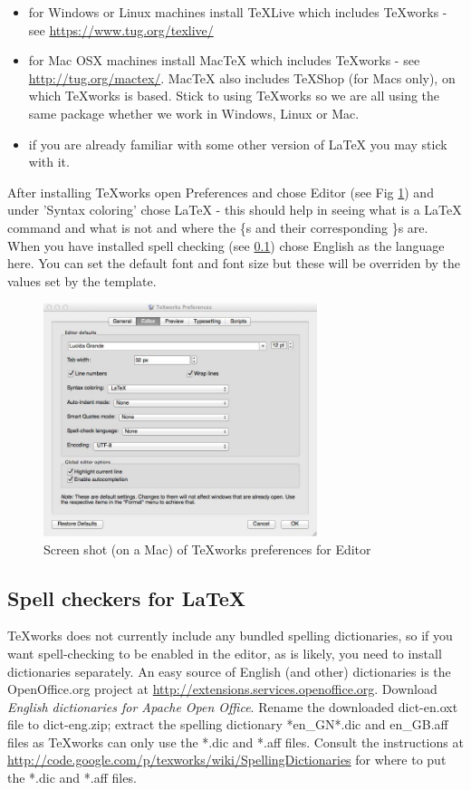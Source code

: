 \documentclass[twoside,fontsize=12pt,
     bibliography=totoc, %
     listof=totoc, %
     index=totoc, %
     onehalfspacing %
]{_MScDiss2017_cls}
\begin{document}
\begin{itemize}
\item for Windows or Linux machines install TeXLive which includes TeXworks - see \url{https://www.tug.org/texlive/} 
\item for Mac OSX machines install MacTeX which includes TeXworks - see \url{http://tug.org/mactex/}. MacTeX also includes TeXShop (for Macs only), on which TeXworks is based. Stick to using TeXworks so we are all using the same package whether we work in Windows, Linux or Mac.
\item if you are already familiar with some other version of LaTeX you may stick with it.
\end{itemize}

After installing TeXworks open Preferences and chose Editor (see Fig \ref{fig:texworks-prefs}) and under 'Syntax coloring' chose LaTeX - this should help in seeing what is a LaTeX command and what is not and where the \{s and their corresponding \}s are. When you have installed spell checking (see \ref{sec:spell}) chose English as the language here.
You can set the default font and font size but these will be overriden by the values set by the template.

\begin{figure}[hbtp]
  \begin{center}
  \includegraphics[width=80mm]{fig-texworks-preferences-editor.jpg}  %
  \caption{Screen shot (on a Mac) of TeXworks preferences for Editor} 
  \label{fig:texworks-prefs}
  \end{center}
\end{figure}

\subsection{Spell checkers for LaTeX}
\label{sec:spell}
TeXworks does not currently include any bundled spelling dictionaries, so if you want spell-checking to be enabled in the editor, as is likely, you need to install dictionaries separately. An easy source of English (and other) dictionaries is the OpenOffice.org project at \url{http://extensions.services.openoffice.org}. Download {\it English dictionaries for Apache Open Office}. Rename the downloaded dict-en.oxt file to dict-eng.zip; extract the spelling dictionary *en\_GN*.dic and en\_GB.aff files as TeXworks can only use the *.dic and *.aff files. Consult the instructions at \url{http://code.google.com/p/texworks/wiki/SpellingDictionaries} for where to put the *.dic and *.aff files.
\end{document}
